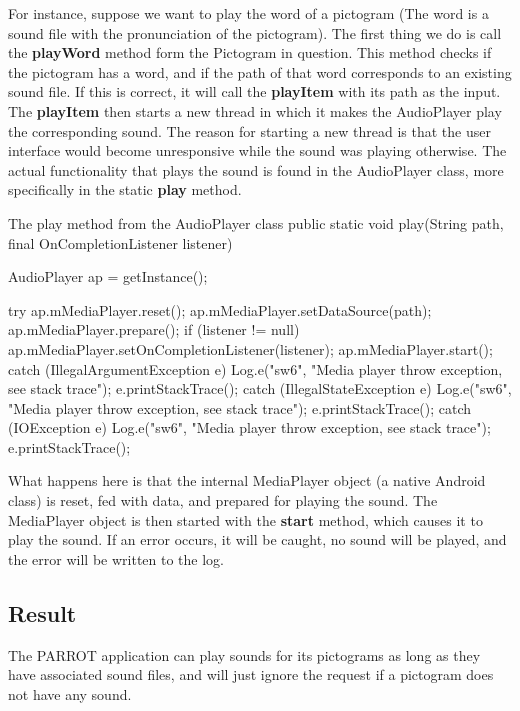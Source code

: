 For instance, suppose we want to play the word of a pictogram (The word is a sound file with the pronunciation of the pictogram). 
The first thing we do is call the \textbf{playWord} method form the Pictogram in question. 
This method checks if the pictogram has a word, and if the path of that word corresponds to an existing sound file. 
If this is correct, it will call the \textbf{playItem} with its path as the input.\newline 
The \textbf{playItem} then starts a new thread in which it makes the AudioPlayer play the corresponding sound. 
The reason for starting a new thread is that the user interface would become unresponsive while the sound was playing otherwise.\newline
The actual functionality that plays the sound is found in the AudioPlayer class, more specifically  in the static \textbf{play} method.\newline

\begin{source}[{audioplay}]{The play method from the AudioPlayer class}
	public static void play(String path, final OnCompletionListener listener)
	{
		AudioPlayer ap = getInstance();
		 
		try {
			ap.mMediaPlayer.reset();
			ap.mMediaPlayer.setDataSource(path);
			ap.mMediaPlayer.prepare();
			if (listener != null)
				ap.mMediaPlayer.setOnCompletionListener(listener);
			ap.mMediaPlayer.start(); 
		} catch (IllegalArgumentException e) {
			Log.e("sw6", "Media player throw exception, see stack trace");
			e.printStackTrace();
		} catch (IllegalStateException e) {
			Log.e("sw6", "Media player throw exception, see stack trace");
			e.printStackTrace();
		} catch (IOException e) {
			Log.e("sw6", "Media player throw exception, see stack trace");
			e.printStackTrace();
		} 
	}
\end{source}

What happens here is that the internal MediaPlayer object (a native Android class) is reset, fed with data, and prepared for playing the sound. The MediaPlayer object is then started with the \textbf{start} method, which causes it to play the sound. If an error occurs, it will be caught, no sound will be played, and the error will be written to the log.\newline

\subsection*{Result}
The PARROT application can play sounds for its pictograms as long as they have associated sound files, and will just ignore the request if a pictogram does not have any sound.

